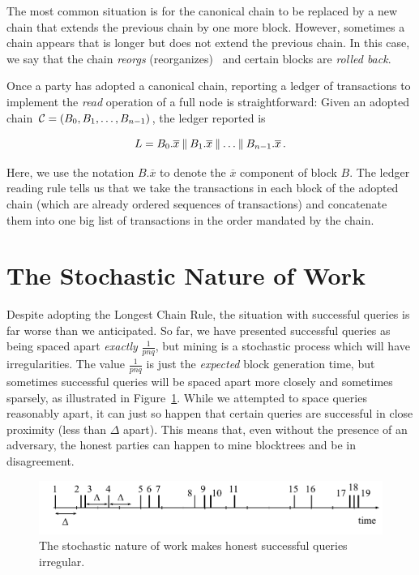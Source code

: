 The most common situation is for the canonical chain to be replaced by a new chain
that extends the previous chain by one more block. However, sometimes a chain appears
that is longer but does not extend the previous chain. In this case, we say that
the chain \emph{reorgs} (reorganizes)~ and certain blocks are \emph{rolled
back}.

Once a party has adopted a canonical chain, reporting a ledger of transactions
to implement the \emph{read} operation of a full node is straightforward:
Given an adopted chain $\mathcal{C} = (B_0, B_1, \ldots, B_{n-1})$, the ledger reported is

\[
    L = B_0.\overline{x} \mathbin{\|} B_1.\overline{x} \mathbin{\|} \ldots \mathbin{\|} B_{n-1}.\overline{x}\,.
\]

Here, we use the notation $B.\overline{x}$ to denote the $\overline{x}$ component
of block $B$. The ledger reading rule tells us that we take the transactions in each
block of the adopted chain (which are already ordered sequences of transactions) and
concatenate them into one big list of transactions in the order mandated by the
chain.

\section{The Stochastic Nature of Work}

Despite adopting the Longest Chain Rule, the situation with successful queries
is far worse than we anticipated.
So far, we have presented successful queries as being
spaced apart \emph{exactly} $\frac{1}{pnq}$, but mining is a stochastic process which will have
irregularities. The value $\frac{1}{pnq}$ is just the \emph{expected} block generation time, but
sometimes successful queries will be spaced apart more closely and sometimes sparsely, as illustrated
in Figure~\ref{fig.stochastic-queries}. While we attempted to space queries reasonably apart, it can
just so happen that certain queries are successful in close proximity (less than $\Delta$ apart).
This means that, even without the presence of an adversary, the honest parties can happen to
mine blocktrees and be in disagreement.

\begin{figure}[h]
    \centering
    \includegraphics[width=0.8 \columnwidth,keepaspectratio]{figures/stochastic-queries.pdf}
    \caption{The stochastic nature of work makes honest successful queries irregular.}
    \label{fig.stochastic-queries}
\end{figure}


